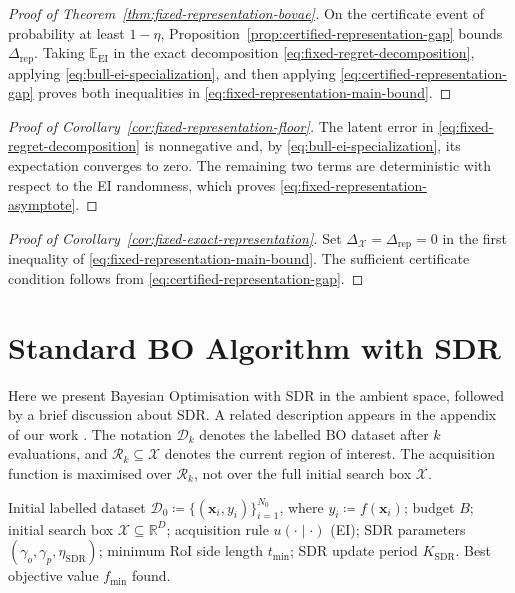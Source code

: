 \documentclass[pdflatex,sn-mathphys-num]{sn-jnl}%
\theoremstyle{thmstyleone}%
\theoremstyle{thmstyletwo}%
\theoremstyle{thmstylethree}%
\begin{document}
\begin{appendices}
\begin{proof}[Proof of Theorem~\ref{thm:fixed-representation-bovae}]
On the certificate event of probability at least $1-\eta$, Proposition~\ref{prop:certified-representation-gap} bounds $\Delta_{\mathrm{rep}}$.  Taking $\mathbb{E}_{\mathrm{EI}}$ in the exact decomposition \eqref{eq:fixed-regret-decomposition}, applying \eqref{eq:bull-ei-specialization}, and then applying \eqref{eq:certified-representation-gap} proves both inequalities in \eqref{eq:fixed-representation-main-bound}.
\end{proof}

\begin{proof}[Proof of Corollary~\ref{cor:fixed-representation-floor}]
The latent error in \eqref{eq:fixed-regret-decomposition} is nonnegative and, by \eqref{eq:bull-ei-specialization}, its expectation converges to zero. The remaining two terms are deterministic with respect to the EI randomness, which proves \eqref{eq:fixed-representation-asymptote}.
\end{proof}

\begin{proof}[Proof of Corollary~\ref{cor:fixed-exact-representation}]
Set $\Delta_{\mathcal{X}}=\Delta_{\mathrm{rep}}=0$ in the first inequality of \eqref{eq:fixed-representation-main-bound}.  The sufficient certificate condition follows from \eqref{eq:certified-representation-gap}.
\end{proof}

\section{Standard BO Algorithm with SDR}\label{appendix: BO-SDR}

Here we present Bayesian Optimisation with SDR in the ambient space, followed by a brief discussion about SDR. A related description appears in the appendix of our work \cite{long2024dimensionalityreductiontechniquesglobal}. The notation \(\mathcal D_k\) denotes the labelled BO dataset after \(k\) evaluations, and \(\mathcal R_k\subseteq\mathcal X\) denotes the current region of interest. The acquisition function is maximised over \(\mathcal R_k\), not over the full initial search box \(\mathcal X\).

\begin{algorithm}[h]
\caption{Bayesian Optimisation with Sequential Domain Reduction}
\label{BOSDR}
\begin{algorithmic}[1]
\Require Initial labelled dataset $\mathcal D_0\coloneq\{(\mathbf x_i,y_i)\}_{i=1}^{N_0}$, where $y_i\coloneq f(\mathbf x_i)$; budget $B$; initial search box $\mathcal X\subseteq\mathbb R^D$; acquisition rule $u(\cdot\mid\cdot)$ \textrm{(EI)}; SDR parameters $(\gamma_o,\gamma_p,\eta_{\mathrm{SDR}})$; minimum RoI side length $t_{\min}$; SDR update period $K_{\mathrm{SDR}}$.
\Ensure Best objective value $f_{\min}$ found.


\end{algorithmic}
\end{algorithm}
\end{appendices}
\end{document}

